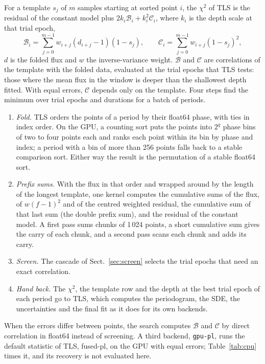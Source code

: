 \documentclass{aastex631}
\begin{document}
For a template $s_j$ of $m$ samples starting at sorted point $i$, the $\chi^2$ of TLS is the residual of the constant model plus $2k_i\mathcal{B}_i+k_i^2\mathcal{C}_i$, where $k_i$ is the depth scale at that trial epoch,
\begin{equation}
\mathcal{B}_i=\sum_{j=0}^{m-1} w_{i+j}(d_{i+j}-1)(1-s_j), \qquad \mathcal{C}_i=\sum_{j=0}^{m-1} w_{i+j}(1-s_j)^2,
\end{equation}
$d$ is the folded flux and $w$ the inverse-variance weight. $\mathcal{B}$ and $\mathcal{C}$ are correlations of the template with the folded data, evaluated at the trial epochs that TLS tests: those where the mean flux in the window is deeper than the shallowest depth fitted. With equal errors, $\mathcal{C}$ depends only on the template. Four steps find the minimum over trial epochs and durations for a batch of periods.
\begin{enumerate}
\item \emph{Fold.} TLS orders the points of a period by their float64 phase, with ties in index order. On the GPU, a counting sort puts the points into $2^q$ phase bins of two to four points each and ranks each point within its bin by phase and index; a period with a bin of more than 256 points falls back to a stable comparison sort. Either way the result is the permutation of a stable float64 sort.
\item \emph{Prefix sums.} With the flux in that order and wrapped around by the length of the longest template, one kernel computes the cumulative sums of the flux, of $w(f-1)^2$ and of the centred weighted residual, the cumulative sum of that last sum (the double prefix sum), and the residual of the constant model. A first pass sums chunks of 1\,024 points, a short cumulative sum gives the carry of each chunk, and a second pass scans each chunk and adds its carry.
\item \emph{Screen.} The cascade of Sect.~\ref{sec:screen} selects the trial epochs that need an exact correlation.
\item \emph{Hand back.} The $\chi^2$, the template row and the depth at the best trial epoch of each period go to TLS, which computes the periodogram, the SDE, the uncertainties and the final fit as it does for its own backends.
\end{enumerate}
When the errors differ between points, the search computes $\mathcal{B}$ and $\mathcal{C}$ by direct correlation in float64 instead of screening. A third backend, \texttt{gpu-pl}, runs the default statistic of TLS, fused-pl, on the GPU with equal errors; Table~\ref{tab:cpu} times it, and its recovery is not evaluated here.
\end{document}
